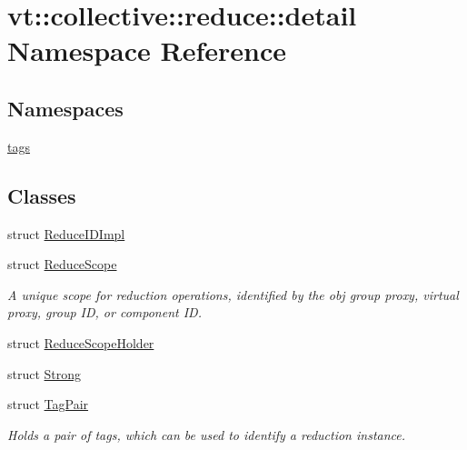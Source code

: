 \hypertarget{namespacevt_1_1collective_1_1reduce_1_1detail}{}\section{vt\+:\+:collective\+:\+:reduce\+:\+:detail Namespace Reference}
\label{namespacevt_1_1collective_1_1reduce_1_1detail}
\subsection*{Namespaces}
\begin{DoxyCompactItemize}
\item 
 \hyperlink{namespacevt_1_1collective_1_1reduce_1_1detail_1_1tags}{tags}
\end{DoxyCompactItemize}
\subsection*{Classes}
\begin{DoxyCompactItemize}
\item 
struct \hyperlink{structvt_1_1collective_1_1reduce_1_1detail_1_1_reduce_i_d_impl}{Reduce\+I\+D\+Impl}
\item 
struct \hyperlink{structvt_1_1collective_1_1reduce_1_1detail_1_1_reduce_scope}{Reduce\+Scope}
\begin{DoxyCompactList}\small\item\em A unique scope for reduction operations, identified by the obj group proxy, virtual proxy, group ID, or component ID. \end{DoxyCompactList}\item 
struct \hyperlink{structvt_1_1collective_1_1reduce_1_1detail_1_1_reduce_scope_holder}{Reduce\+Scope\+Holder}
\item 
struct \hyperlink{structvt_1_1collective_1_1reduce_1_1detail_1_1_strong}{Strong}
\item 
struct \hyperlink{structvt_1_1collective_1_1reduce_1_1detail_1_1_tag_pair}{Tag\+Pair}
\begin{DoxyCompactList}\small\item\em Holds a pair of tags, which can be used to identify a reduction instance. \end{DoxyCompactList}\end{DoxyCompactItemize}
